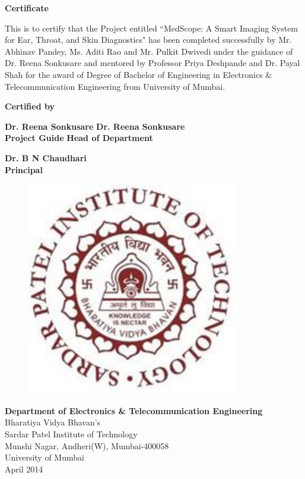 \thispagestyle{empty}
\vspace*{0.2cm}
\vspace{1cm}
\begin{center}
\large\textbf{Certificate}
\end{center}
\vspace{1cm}
This is to certify that the Project entitled ``MedScope: A Smart Imaging System for Ear, Throat, and Skin Diagnostics" has been completed successfully by Mr. Abhinav Pandey, Ms. Aditi Rao and Mr. Pulkit Dwivedi under the guidance of Dr. Reena Sonkusare and mentored by Professor Priya Deshpande and Dr. Payal Shah for the award of Degree of Bachelor of Engineering in Electronics \& Telecommunication Engineering from University of Mumbai.\\
\vspace{1cm}
\begin{center}
\textbf{Certified by}
\end{center}
\vspace{1cm}


\textbf {Dr. Reena Sonkusare} \hspace{2.4in} \textbf{Dr. Reena Sonkusare   }\\ \hspace*{0.5cm}
\textbf {Project Guide} \hspace{3in} \textbf{Head of Department} \\
\vspace{1cm}
 

\begin{center}
\textbf{Dr. B N Chaudhari}\\
\textbf{Principal}
\end{center}
 
\begin{figure}[h]
\centering
\includegraphics[scale=0.8]{spitlogo.pdf}

\end{figure}
\hspace{.05cm}
\hspace{.05cm}
 
\begin{center}
\textbf {Department of Electronics \& Telecommunication Engineering}\\
Bharatiya  Vidya Bhavan's\\
Sardar Patel Institute of Technology\\
Munshi Nagar, Andheri(W), Mumbai-400058\\
University of Mumbai\\
April 2014\\
\end{center}

